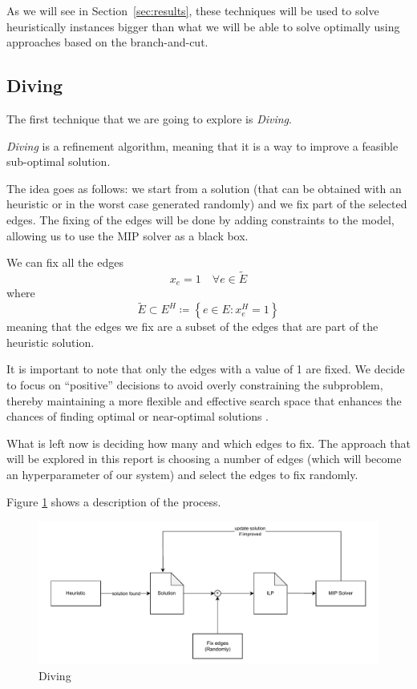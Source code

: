 \documentclass{article}
\begin{document}
As we will see in Section~\ref{sec:results}, these techniques will be used to solve
heuristically instances bigger than what we will be able to solve optimally using approaches
based on the branch-and-cut.

\subsection{Diving}
The first technique that we are going to explore is \textit{Diving}.

\textit{Diving} is a refinement algorithm, meaning that it is a way to improve a feasible
sub-optimal solution.

The idea goes as follows: we start from a solution (that can be obtained with an heuristic or in
the worst case generated randomly) and we fix part of the selected edges. The fixing of the
edges will be done by adding constraints to the model, allowing us to use the MIP solver
as a black box.

We can fix all the edges
\begin{equation*}
  x_{e}=1 \quad \forall e \in \tilde{E}
\end{equation*}
where
\begin{equation*}
  \tilde{E} \subset E^{H} \coloneq \left\{ e \in E : x_{e}^{H} = 1 \right\}
\end{equation*}
meaning that the edges we fix are a subset of the edges that are part of the heuristic solution.

It is important to note that only the edges with a value of 1 are fixed. We
decide to focus on ``positive'' decisions to avoid overly constraining the
subproblem, thereby maintaining a more flexible and effective search space that
enhances the chances of finding optimal or near-optimal solutions \cite{maniezzo2021diving}.

What is left now is deciding how many and which edges to fix. The approach that will be explored
in this report is choosing a number of edges (which will become an hyperparameter of our system)
and select the edges to fix randomly.

Figure \ref{fig:diving} shows a description of the process.

\begin{figure}[H]
        \caption{Diving}
        \label{fig:diving}
        \centering
        \includegraphics[width=340pt]{assets/diving.drawio.pdf}
\end{figure}
\end{document}

